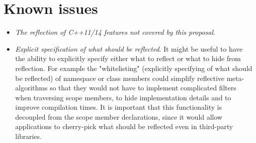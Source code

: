 \section{Known issues}

\begin{itemize}

\item {\em The reflection of C++11/14 features not covered by this proposal}.

\item {\em Explicit specification of what should be reflected}. It might be useful to have
the ability to explicitly specify either what to reflect or what to hide from reflection.
For example the "whitelisting" (explicitly specifying of what should be reflected) of namespace
or class members could simplify reflective meta-algorithms so that they would not have
to implement complicated filters when traversing scope members, to hide implementation details and
to improve compilation times. It is important that this functionality is decoupled from the
scope member declarations, since it would allow applications to cherry-pick what should be
reflected even in third-party libraries.

\end{itemize}

